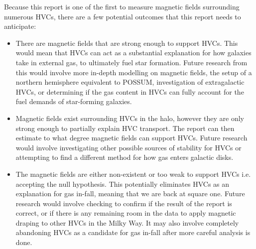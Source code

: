 Because this report is one of the first to measure magnetic fields surrounding numerous HVCs, there are a few potential outcomes that this report needs to anticipate:
\begin{itemize}
\item There are magnetic fields that are strong enough to support HVCs. This would mean that HVCs can act as a substantial explanation for how galaxies take in external gas, to ultimately fuel star formation. Future research from this would involve more in-depth modelling on magnetic fields, the setup of a northern hemisphere equivalent to POSSUM, investigation of extragalactic HVCs, or determining if the gas content in HVCs can fully account for the fuel demands of star-forming galaxies.
\item Magnetic fields exist surrounding HVCs in the halo, however they are only strong enough to partially explain HVC transport. The report can then estimate to what degree magnetic fields can support HVCs. Future research would involve investigating other possible sources of stability for HVCs or attempting to find a different method for how gas enters galactic disks.
\item The magnetic fields are either non-existent or too weak to support HVCs i.e. accepting the null hypothesis. This potentially eliminates HVCs as an explanation for gas in-fall, meaning that we are back at square one. Future research would involve checking to confirm if the result of the report is correct, or if there is any remaining room in the data to apply magnetic draping to other HVCs in the Milky Way. It may also involve completely abandoning HVCs as a candidate for gas in-fall after more careful analysis is done.
\end{itemize}